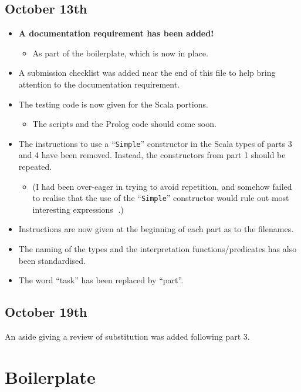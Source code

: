 \documentclass[11pt]{article}
\begin{document}
\subsection*{October 13th}
\label{sec:orgd937abc}
\begin{itemize}
\item \textbf{A documentation requirement has been added!}
\begin{itemize}
\item As part of the boilerplate, which is now in place.
\end{itemize}
\item A submission checklist was added near the end of this file
to help bring attention to the documentation requirement.
\item The testing code is now given for the Scala portions.
\begin{itemize}
\item The scripts and the Prolog code should come soon.
\end{itemize}
\item The instructions to use a “\texttt{Simple}” constructor in
the Scala types of parts 3 and 4 have been removed.
Instead, the constructors from part 1 should be repeated.
\begin{itemize}
\item (I had been over-eager in trying to avoid repetition,
and somehow failed to realise that the use of the “\texttt{Simple}”
constructor would rule out most interesting expressions 🙁.)
\end{itemize}
\item Instructions are now given at the beginning of each part
as to the filenames.
\item The naming of the types and the interpretation functions/predicates
has also been standardised.
\item The word “task” has been replaced by “part”.
\end{itemize}

\subsection*{October 19th}
\label{sec:orgbd6e7a7}
An aside giving a review of substitution was added following part 3.

\section*{Boilerplate}
\label{sec:org23e1a86}
\end{document}
